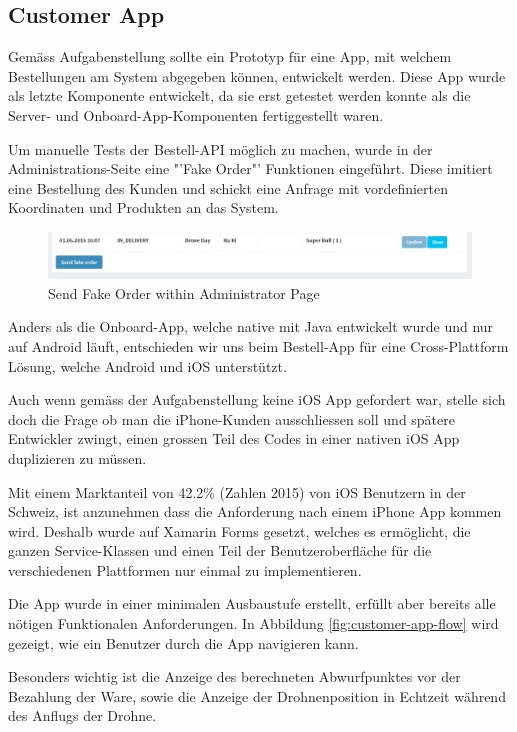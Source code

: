\subsection{Customer App}
Gemäss Aufgabenstellung sollte ein Prototyp für eine App, mit welchem Bestellungen am System abgegeben können, entwickelt werden.
Diese App wurde als letzte Komponente entwickelt, da sie erst getestet werden konnte als die Server- und Onboard-App-Komponenten fertiggestellt waren.

Um manuelle Tests der Bestell-API möglich zu machen, wurde in der Administrations-Seite eine "'Fake Order"' Funktionen eingeführt. 
Diese imitiert eine Bestellung des Kunden und schickt eine Anfrage mit vordefinierten Koordinaten und Produkten an das System.

\begin{figure}[h]
	\centering
	\includegraphics[width=1\textwidth] {images/customer-app-fake-order.png}
	\caption{Send Fake Order within Administrator Page}
\end{figure}

Anders als die Onboard-App, welche native mit Java entwickelt wurde und nur auf Android läuft, entschieden wir uns beim Bestell-App für eine Cross-Plattform Lösung, welche Android und iOS unterstützt. 

Auch wenn gemäss der Aufgabenstellung keine iOS App gefordert war, stelle sich doch die Frage ob man die iPhone-Kunden ausschliessen soll und spätere Entwickler zwingt, einen grossen Teil des Codes in einer nativen iOS App duplizieren zu müssen.

Mit einem Marktanteil von 42.2\% (Zahlen 2015) \cite{ios-user} von iOS Benutzern in der Schweiz, ist anzunehmen dass die Anforderung nach einem iPhone App kommen wird. Deshalb wurde auf Xamarin Forms gesetzt, welches es ermöglicht, die ganzen Service-Klassen und einen Teil der Benutzeroberfläche für die verschiedenen Plattformen nur einmal zu implementieren.

Die App wurde in einer minimalen Ausbaustufe erstellt, erfüllt aber bereits alle nötigen Funktionalen Anforderungen. In Abbildung \ref{fig:customer-app-flow} wird gezeigt, wie ein Benutzer durch die App navigieren kann. 

Besonders wichtig ist die Anzeige des berechneten Abwurfpunktes vor der Bezahlung der Ware, sowie die Anzeige der Drohnenposition in Echtzeit während des Anflugs der Drohne.  

